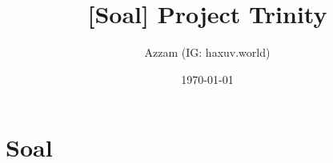 

\title{[Soal] Project Trinity}
\author{Azzam (IG: haxuv.world)}
\date{\today}



\maketitle

\renewcommand*\contentsname{Daftar Isi}
\tableofcontents

\newpage
\section{Soal}


